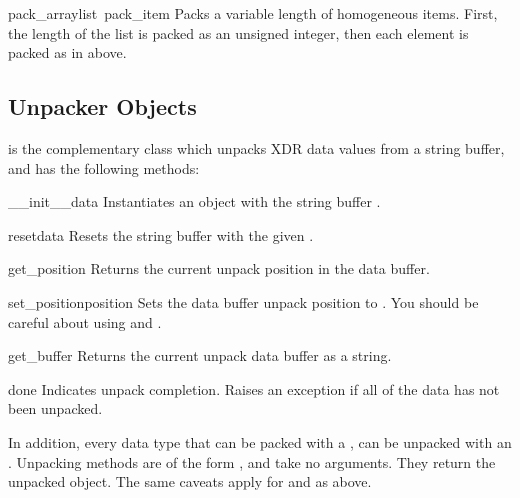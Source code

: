 \begin{funcdesc}{pack_array}{list\, pack_item}
Packs a variable length  of homogeneous items.  First, the
length of the list is packed as an unsigned integer, then each element
is packed as in  above.
\end{funcdesc}

\subsection{Unpacker Objects}

 is the complementary class which unpacks XDR data
values from a string buffer, and has the following methods:

\begin{funcdesc}{__init__}{data}
Instantiates an  object with the string buffer
.
\end{funcdesc}

\begin{funcdesc}{reset}{data}
Resets the string buffer with the given .
\end{funcdesc}

\begin{funcdesc}{get_position}{}
Returns the current unpack position in the data buffer.
\end{funcdesc}

\begin{funcdesc}{set_position}{position}
Sets the data buffer unpack position to .  You should be
careful about using  and .
\end{funcdesc}

\begin{funcdesc}{get_buffer}{}
Returns the current unpack data buffer as a string.
\end{funcdesc}

\begin{funcdesc}{done}{}
Indicates unpack completion.  Raises an  exception
if all of the data has not been unpacked.
\end{funcdesc}

In addition, every data type that can be packed with a ,
can be unpacked with an .  Unpacking methods are of the
form , and take no arguments.  They return the
unpacked object.  The same caveats apply for  and
 as above.

